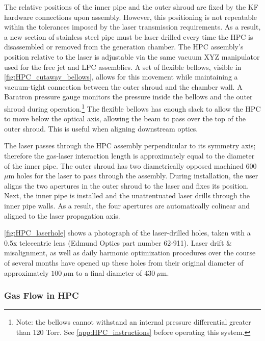 The relative positions of the inner pipe and the outer shroud are fixed by the KF hardware connections upon assembly. However, this positioning is not repeatable within the tolerances imposed by the laser transmission requirements. As a result, a new section of stainless steel pipe must be laser drilled every time the HPC is disassembled or removed from the generation chamber. The HPC assembly's position relative to the laser is adjustable via the same vacuum XYZ manipulator used for the free jet and LPC assemblies. A set of flexible bellows, visible in \cref{fig:HPC_cutaway_bellows}, allows for this movement while maintaining a vacuum-tight connection between the outer shroud and the chamber wall. A Baratron pressure gauge monitors the pressure inside the bellows and the outer shroud during operation.\footnote{Note: the bellows cannot withstand an internal pressure differential greater than 120 Torr. See \cref{app:HPC_instructions} before operating this system.} The flexible bellows has enough slack to allow the HPC to move below the optical axis, allowing the beam to pass over the top of the outer shroud. This is useful when aligning downstream optics.

The laser passes through the HPC assembly perpendicular to its symmetry axis; therefore the gas-laser interaction length is approximately equal to the diameter of the inner pipe. The outer shroud has two diametrically opposed machined 600 $\mu$m holes for the laser to pass through the assembly. During installation, the user aligns the two apertures in the outer shroud to the laser and fixes its position. Next, the inner pipe is installed and the unattentuated laser drills through the inner pipe walls. As a result, the four apertures are automatically colinear and aligned to the laser propagation axis.

\cref{fig:HPC_laserhole} shows a photograph of the laser-drilled holes, taken with a 0.5x telecentric lens (Edmund Optics part number 62-911). Laser drift \&  misalignment, as well as daily harmonic optimization procedures over the course of several months have opened up these holes from their original diameter of approximately $100 \ \mu \textrm{m}$ to a final diameter of $430 \ \mu \textrm{m}$.

\subsubsection{Gas Flow in HPC}

